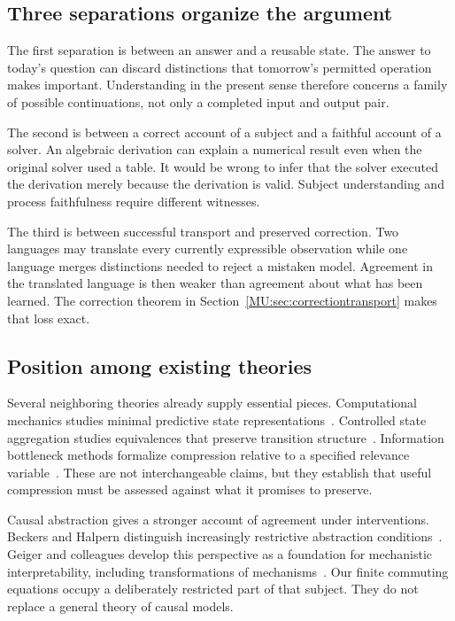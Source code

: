 \subsection{Three separations organize the argument}
The first separation is between an answer and a reusable state. The answer to today's question can discard distinctions that tomorrow's permitted operation makes important. Understanding in the present sense therefore concerns a family of possible continuations, not only a completed input and output pair.

The second is between a correct account of a subject and a faithful account of a solver. An algebraic derivation can explain a numerical result even when the original solver used a table. It would be wrong to infer that the solver executed the derivation merely because the derivation is valid. Subject understanding and process faithfulness require different witnesses.

The third is between successful transport and preserved correction. Two languages may translate every currently expressible observation while one language merges distinctions needed to reject a mistaken model. Agreement in the translated language is then weaker than agreement about what has been learned. The correction theorem in Section~\ref{MU:sec:correctiontransport} makes that loss exact.

\subsection{Position among existing theories}
Several neighboring theories already supply essential pieces. Computational mechanics studies minimal predictive state representations~\cite{MU:shalizi}. Controlled state aggregation studies equivalences that preserve transition structure~\cite{MU:givan}. Information bottleneck methods formalize compression relative to a specified relevance variable~\cite{MU:tishby}. These are not interchangeable claims, but they establish that useful compression must be assessed against what it promises to preserve.

Causal abstraction gives a stronger account of agreement under interventions. Beckers and Halpern distinguish increasingly restrictive abstraction conditions~\cite{MU:beckers}. Geiger and colleagues develop this perspective as a foundation for mechanistic interpretability, including transformations of mechanisms~\cite{MU:geiger}. Our finite commuting equations occupy a deliberately restricted part of that subject. They do not replace a general theory of causal models.

